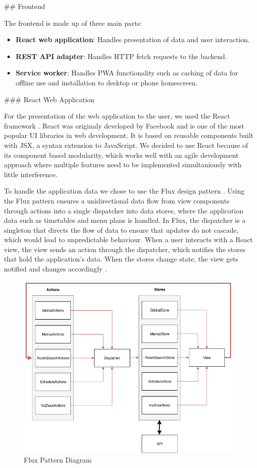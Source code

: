 \begin{markdown}
## Frontend

The frontend is made up of three main parts:

\begin{itemize}
  \item \textbf{React web application}: Handles presentation of data and user interaction.
  \item \textbf{REST API adapter}: Handles HTTP fetch requests to the backend.
  \item \textbf{Service worker}: Handles PWA functionality such as caching of data for offline use and installation to desktop or phone homescreen.
\end{itemize}

### React Web Application

For the presentation of the web application to the user, we used the React framework \cite{React}. React was originaly developed by Facebook and is one of the most popular UI libraries in web development. It is based on reusable components built with JSX, a syntax extension to JavaScript. We decided to use React because of its component based modularity, which works well with an agile development approach where multiple features need to be implemented simultaniously with little interference.

To handle the application data we chose to use the Flux design pattern \cite{Flux}. Using the Flux pattern ensures a unidirectional data flow from view components through actions into a single dispatcher into data stores, where the application data such as timetables and menu plans is handled. In Flux, the dispatcher is a singleton that directs the flow of data to ensure that updates do not cascade, which would lead to unpredictable behaviour. When a user interacts with a React view, the view sends an action through the dispatcher, which notifies the stores that hold the application’s data. When the stores change state, the view gets notified and changes accordingly \cite{Flux}.

\bigskip

\begin{figure}[H]
  \includegraphics[width=11.3cm, center]{../../diagrams/flux.png}
  \caption{\textsf{Flux Pattern Diagram}}
\end{figure}


\end{markdown}
